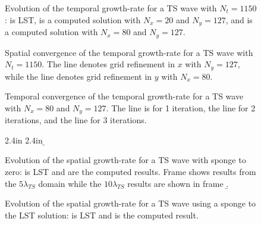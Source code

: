 %
%
%
%
\begin{figure}[p]
\centering
{}
\setvlabel{ $\sigma$ }
\epsfxsize=5.0in 
\caption[Evolution of the temporal growth-rate for a TS wave] {Evolution of the
temporal growth-rate for a TS wave with $N_t=1150$: \solid is LST, \dashed is
a computed solution with $N_x=20$ and $N_y=127$, and \dotted is a computed
solution with $N_x=80$ and $N_y=127$. \label{f:ttsgrowth}}
\end{figure}
%
\begin{figure}[p]
\centering
{}
\epsfxsize=4.5in 
\caption[Spatial convergence of the temporal growth-rate for a TS wave]
{Spatial convergence of the temporal growth-rate for a TS wave with
$N_t=1150$.  The \solid line denotes grid refinement in $x$ with $N_y=127$,
while the \dashed line denotes grid refinement in $y$ with
$N_x=80$. \label{f:spconv} }
\end{figure}
%
\begin{figure}[p]
\centering
{}
\epsfxsize=4.5in 
\caption[Temporal convergence of the temporal growth-rate for a TS wave]
{Temporal convergence of the temporal growth-rate for a TS wave with $N_x=80$
and $N_y=127$.  The \solid line is for 1 iteration, the \dashed line for 2
iterations, and the \dotted line for 3 iterations. \label{f:tmconv} }
\end{figure}
%
%
\begin{figure}[p]
\centering
{}
\setvlabel{$\sigma$}
\figlab 1.0in 2.4in {\a} 
\epsfxsize=5.0in 
\bigskip
{}
\setvlabel{$\sigma$}
\figlab 1.0in 2.4in {\b} 
\epsfxsize=5.0in 
\caption[Spatial growth-rate for a TS wave with sponge to
zero] {Evolution of the spatial growth-rate for a TS wave with sponge to zero:
\solid is LST and \dashed are the computed results.  Frame \a shows results
from the $5 \lambda_{TS}$ domain while the $10 \lambda_{TS}$ results are shown
in frame \b. \label{f:stsgrowth}}
\end{figure}
%
\begin{figure}[p]
\centering
{}
\setvlabel{$\sigma$}
\epsfxsize=5.0in 
\caption[Spatial growth-rate for a TS wave using a sponge to
the LST solution] {Evolution of the spatial growth-rate for a TS wave using a
sponge to the LST solution: \solid is LST and \dashed is the computed result.
\label{f:stsgrowth2}}
\end{figure}
